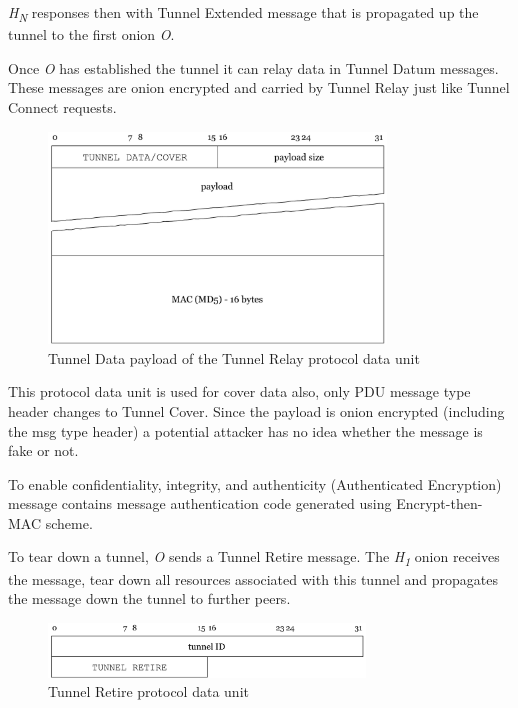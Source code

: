 \documentclass{article}
\begin{document}
\textit{H\textsubscript{N}} responses then with Tunnel Extended message that is propagated up the tunnel to the first onion \textit{O}.

Once \textit{O} has established the tunnel it can relay data in Tunnel  Datum messages. These messages are onion encrypted and carried by Tunnel Relay just like Tunnel Connect requests.

\begin{figure}[H]
\centering
     \includegraphics[width=0.8\textwidth]{tunnel-datum.pdf}
      \caption{Tunnel Data payload of the Tunnel Relay protocol data unit}
\end{figure}

This protocol data unit is used for cover data also, only PDU message type header changes to Tunnel Cover. Since the payload is onion encrypted (including the msg type header) a potential attacker has no idea whether the message is fake or not.

To enable confidentiality, integrity, and authenticity (Authenticated Encryption) message contains message authentication code generated using Encrypt-then-MAC scheme.

To tear down a tunnel, \textit{O} sends a Tunnel Retire message. The \textit{H\textsubscript{1}} onion receives the message, tear down all resources associated with this tunnel and propagates the message down the tunnel to further peers.

\begin{figure}[H]
\centering
     \includegraphics[width=0.75\textwidth]{tunnel-retire.pdf}
      \caption{Tunnel Retire protocol data unit}
\end{figure}
\end{document}
